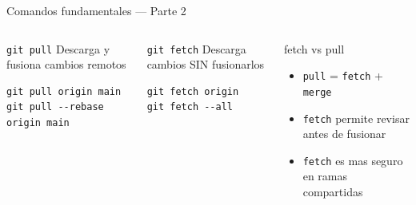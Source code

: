 \documentclass[aspectratio=169]{beamer}
\begin{document}
\begin{frame}[fragile]{Comandos fundamentales --- Parte 2}
  \begin{columns}
      \begin{exampleblock}{\texttt{git pull}}
        Descarga y fusiona cambios remotos
        \begin{lstlisting}[style=bash]
git pull origin main
git pull --rebase origin main
        \end{lstlisting}
      \end{exampleblock}

      \vspace{0.3cm}

      \begin{exampleblock}{\texttt{git fetch}}
        Descarga cambios SIN fusionarlos
        \begin{lstlisting}[style=bash]
git fetch origin
git fetch --all
        \end{lstlisting}
      \end{exampleblock}

      \begin{block}{fetch vs pull}
        \begin{itemize}
          \item \texttt{pull} = \texttt{fetch} + \texttt{merge}
          \item \texttt{fetch} permite revisar antes de fusionar
          \item \texttt{fetch} es mas seguro en ramas compartidas
        \end{itemize}
      \end{block}
  \end{columns}
\end{frame}
\end{document}
